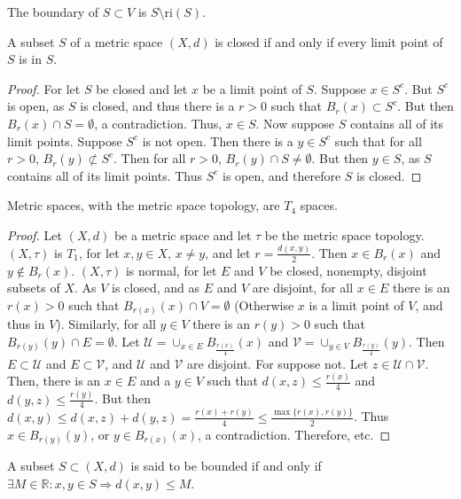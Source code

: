 \documentclass[crop=false,class=article,oneside]{standalone}
\begin{document}
        \begin{definition}
        The boundary of $S\subset V$ is $S\setminus \textrm{ri}(S)$.
        \end{definition}
        \begin{theorem}
        A subset $S$ of a metric space $(X,d)$ is closed if and only if every limit point of $S$ is in $S$.
        \end{theorem}
        \begin{proof}
        For let $S$ be closed and let $x$ be a limit point of $S$. Suppose $x\in S^c$. But $S^c$ is open, as $S$ is closed, and thus there is a $r>0$ such that $B_{r}(x)\subset S^c$. But then $B_{r}(x)\cap S = \emptyset$, a contradiction. Thus, $x\in S$. Now suppose $S$ contains all of its limit points. Suppose $S^c$ is not open. Then there is a $y\in S^c$ such that for all $r>0$, $B_{r}(y)\not \subset S^c$. Then for all $r>0$, $B_{r}(y)\cap S \ne \emptyset$. But then $y\in S$, as $S$ contains all of its limit points. Thus $S^c$ is open, and therefore $S$ is closed.
        \end{proof}
        \begin{theorem}
        Metric spaces, with the metric space topology, are $T_4$ spaces.
        \end{theorem}
        \begin{proof}
        Let $(X,d)$ be a metric space and let $\tau$ be the metric space topology. $(X,\tau)$ is $T_1$, for let $x,y\in X$, $x\ne y$, and let $r= \frac{d(x,y)}{2}$. Then $x\in B_{r}(x)$ and $y\notin B_{r}(x)$. $(X,\tau)$ is normal, for let $E$ and $V$ be closed, nonempty, disjoint subsets of $X$. As $V$ is closed, and as $E$ and $V$ are disjoint, for all $x\in E$ there is an $r(x)>0$ such that $B_{r(x)}(x)\cap V = \emptyset$ (Otherwise $x$ is a limit point of $V$, and thus in $V$). Similarly, for all $y\in V$ there is an $r(y)>0$ such that $B_{r(y)}(y)\cap E = \emptyset$. Let $\mathcal{U} = \cup_{x\in E}B_{\frac{r(x)}{4}}(x)$ and $\mathcal{V} = \cup_{y\in V}B_{\frac{r(y)}{4}}(y)$. Then $E\subset \mathcal{U}$ and $E\subset \mathcal{V}$, and $\mathcal{U}$ and $\mathcal{V}$ are disjoint. For suppose not. Let $z\in \mathcal{U}\cap \mathcal{V}$. Then, there is an $x\in E$ and a $y\in V$ such that $d(x,z)\leq \frac{r(x)}{4}$ and $d(y,z)\leq \frac{r(y)}{4}$. But then $d(x,y) \leq d(x,z)+d(y,z) = \frac{r(x)+r(y)}{4} \leq \frac{\max\{r(x),r(y)\}}{2}$. Thus $x\in B_{r(y)}(y)$, or $y\in B_{r(x)}(x)$, a contradiction. Therefore, etc.
        \end{proof}
        \begin{definition}
        A subset $S\subset (X,d)$ is said to be bounded if and only if $\exists M\in \mathbb{R}:x,y\in S\Rightarrow d(x,y)\leq M$.
        \end{definition}
\end{document}
